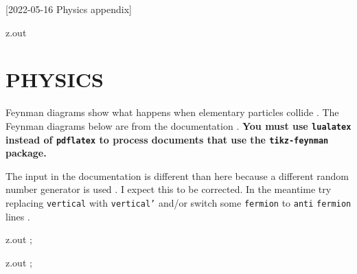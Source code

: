 [2022-05-16 Physics appendix]

\begin{VerbatimOut}{z.out}
\chapter{PHYSICS}

Feynman diagrams
show what happens
when elementary particles collide
\cite{feynman-diagram}.
The Feynman diagrams below are from the
 documentation \cite{ellis2016}.
\textbf{%
  You must use \texttt{lualatex} instead
  of \texttt{pdflatex}
  to process documents that use the \texttt{tikz-feynman} package.%
}

The input
in the documentation
is different than here because a different random number generator
is used \cite{menke2019}.
I expect this to be corrected.
In the meantime try replacing \texttt{vertical}
with \texttt{vertical'}
and/or switch some \texttt{fermion}
to \texttt{anti} \texttt{fermion} lines \cite{ellis2017}.
\end{VerbatimOut}

\MyIO


\begin{VerbatimOut}{z.out}
;
\end{VerbatimOut}

\MyIO


\begin{VerbatimOut}{z.out}
;
\end{VerbatimOut}

\MyIO
